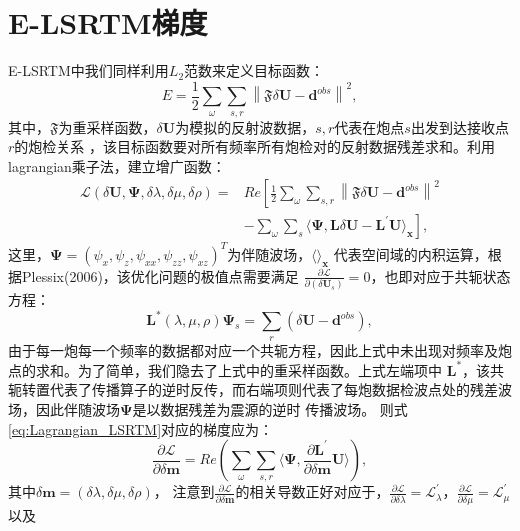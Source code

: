 \section{E-LSRTM梯度}
E-LSRTM中我们同样利用$L_2$范数来定义目标函数：
\begin{equation}
    E=\frac{1}{2}\sum_{\omega}\sum_{s,r}\left\lVert \mathfrak{F}\delta \mathbf{U}-\mathbf{d}^{obs} \right \rVert^2,
    \label{eq:misfit_LSRTM}
\end{equation}
其中，$\mathfrak{F}$为重采样函数，$\delta\mathbf{U}$为模拟的反射波数据，$s,r$代表在炮点$s$出发到达接收点$r$的炮检关系
，该目标函数要对所有频率所有炮检对的反射数据残差求和。利用lagrangian乘子法，建立增广函数：
\begin{equation}
\begin{split}
    \mathcal{L}(\delta\mathbf{U},\bm\Psi,\delta\lambda,\delta\mu,\delta\rho)=&Re\left[
	\frac{1}{2}\sum_{\omega}\sum_{s,r}\left\lVert \mathfrak{F}\delta \mathbf{U}-\mathbf{d}^{obs} \right \rVert^2 \right. \\
	&\left.-\sum_{\omega}\sum_{s}\langle\bm\Psi,\mathbf{L}\delta\mathbf{U}-\mathbf{L}^{'}\mathbf{U}\rangle_{\mathbf{x}}\right],
    \label{eq:Lagrangian_LSRTM}
\end{split}
\end{equation}
这里，$\bm\Psi=(\psi_x,\psi_z,\psi_{xx},\psi_{zz},\psi_{xz})^T$为伴随波场，$\langle\rangle_\mathbf{x}$
代表空间域的内积运算，根据Plessix(2006)\cite{plessix2006}，该优化问题的极值点需要满足
$\frac{\partial\mathcal{L}}{\partial(\delta\mathbf{U}_s)}=0$，也即对应于共轭状态方程：
\begin{equation}
	\mathbf{L}^*(\lambda,\mu,\rho)\bm\Psi_s=\sum_{r}(\delta\mathbf{U}-\mathbf{d}^{obs}),
    \label{eq:Adjoint_LSRTM} 
\end{equation}
由于每一炮每一个频率的数据都对应一个共轭方程，因此上式中未出现对频率及炮点的求和。为了简单，我们隐去了上式中的重采样函数。上式左端项中
$\mathbf{L}^*$，该共轭转置代表了传播算子的逆时反传，而右端项则代表了每炮数据检波点处的残差波场，因此伴随波场$\bm\Psi$是以数据残差为震源的逆时
传播波场。
则式\ref{eq:Lagrangian_LSRTM}对应的梯度应为：
\begin{equation}
    \frac{\partial\mathcal{L}}{\partial \delta\mathbf{m}}=Re\left(\sum_{\omega}\sum_{s,r}
	\langle\bm\Psi,\frac{\partial \mathbf{L}^{'}}{\partial\delta\mathbf{m}}\mathbf{U}\rangle\right),
    \label{eq:Gradient_LSRTM}
\end{equation}
其中$\delta\mathbf{m}=(\delta\lambda, \delta\mu,\delta\rho)$，
注意到$\frac{\partial\mathcal{L}}{\partial \delta\mathbf{m}}$的相关导数正好对应于，$\frac{\partial\mathcal{L}}{\partial 
\delta\lambda}=\mathcal{L}^{'}_{\lambda}$，$\frac{\partial\mathcal{L}}{\partial\delta\mu}=\mathcal{L}^{'}_{\mu}$以及
